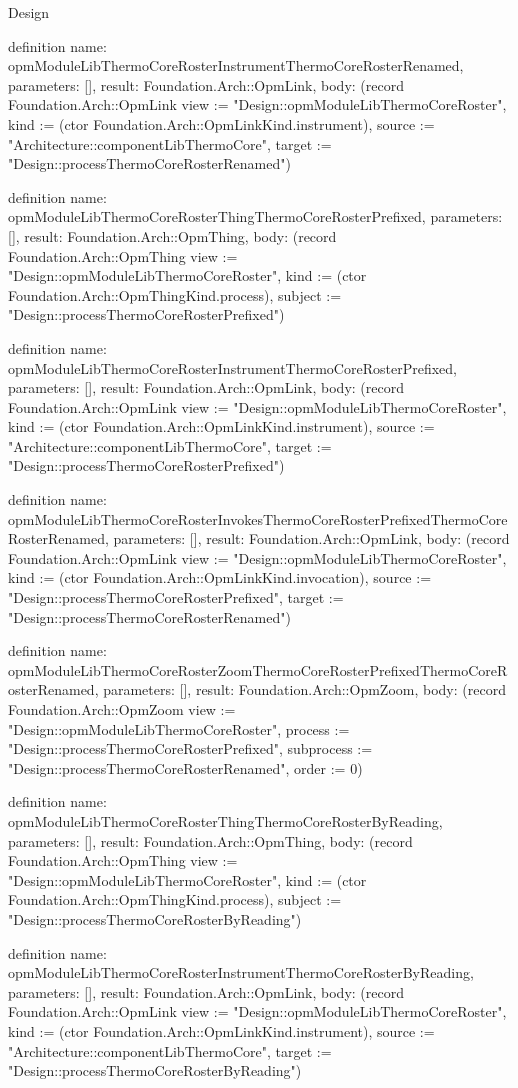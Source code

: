 \begin{lexlean}{Design}
\begin{semanticmodule}
definition{
  name: opmModuleLibThermoCoreRosterInstrumentThermoCoreRosterRenamed,
  parameters: [],
  result: Foundation.Arch::OpmLink,
  body: (record Foundation.Arch::OpmLink {view := "Design::opmModuleLibThermoCoreRoster", kind := (ctor Foundation.Arch::OpmLinkKind.instrument), source := "Architecture::componentLibThermoCore", target := "Design::processThermoCoreRosterRenamed"})
}

definition{
  name: opmModuleLibThermoCoreRosterThingThermoCoreRosterPrefixed,
  parameters: [],
  result: Foundation.Arch::OpmThing,
  body: (record Foundation.Arch::OpmThing {view := "Design::opmModuleLibThermoCoreRoster", kind := (ctor Foundation.Arch::OpmThingKind.process), subject := "Design::processThermoCoreRosterPrefixed"})
}

definition{
  name: opmModuleLibThermoCoreRosterInstrumentThermoCoreRosterPrefixed,
  parameters: [],
  result: Foundation.Arch::OpmLink,
  body: (record Foundation.Arch::OpmLink {view := "Design::opmModuleLibThermoCoreRoster", kind := (ctor Foundation.Arch::OpmLinkKind.instrument), source := "Architecture::componentLibThermoCore", target := "Design::processThermoCoreRosterPrefixed"})
}

definition{
  name: opmModuleLibThermoCoreRosterInvokesThermoCoreRosterPrefixedThermoCoreRosterRenamed,
  parameters: [],
  result: Foundation.Arch::OpmLink,
  body: (record Foundation.Arch::OpmLink {view := "Design::opmModuleLibThermoCoreRoster", kind := (ctor Foundation.Arch::OpmLinkKind.invocation), source := "Design::processThermoCoreRosterPrefixed", target := "Design::processThermoCoreRosterRenamed"})
}

definition{
  name: opmModuleLibThermoCoreRosterZoomThermoCoreRosterPrefixedThermoCoreRosterRenamed,
  parameters: [],
  result: Foundation.Arch::OpmZoom,
  body: (record Foundation.Arch::OpmZoom {view := "Design::opmModuleLibThermoCoreRoster", process := "Design::processThermoCoreRosterPrefixed", subprocess := "Design::processThermoCoreRosterRenamed", order := 0})
}

definition{
  name: opmModuleLibThermoCoreRosterThingThermoCoreRosterByReading,
  parameters: [],
  result: Foundation.Arch::OpmThing,
  body: (record Foundation.Arch::OpmThing {view := "Design::opmModuleLibThermoCoreRoster", kind := (ctor Foundation.Arch::OpmThingKind.process), subject := "Design::processThermoCoreRosterByReading"})
}

definition{
  name: opmModuleLibThermoCoreRosterInstrumentThermoCoreRosterByReading,
  parameters: [],
  result: Foundation.Arch::OpmLink,
  body: (record Foundation.Arch::OpmLink {view := "Design::opmModuleLibThermoCoreRoster", kind := (ctor Foundation.Arch::OpmLinkKind.instrument), source := "Architecture::componentLibThermoCore", target := "Design::processThermoCoreRosterByReading"})
}


\end{semanticmodule}
\end{lexlean}
